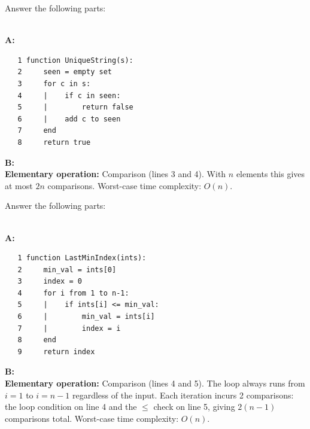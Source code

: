 \documentclass[10pt]{exam}
\begin{document}
\begin{questions}
\question[8] Answer the following parts:

\begin{solution}\\
    \textbf{A:}
    \begin{verbatim}
   1 function UniqueString(s):
   2     seen = empty set
   3     for c in s:
   4     |    if c in seen:
   5     |        return false
   6     |    add c to seen
   7     end
   8     return true
    \end{verbatim}
    \textbf{B:}\\
    \textbf{Elementary operation:} Comparison (lines 3 and 4).
    With $n$ elements this gives at most $2n$ comparisons.
    Worst-case time complexity: $O(n)$.
\end{solution}

\question[8] Answer the following parts:

\begin{solution}\\
    \textbf{A:}
    \begin{verbatim}
   1 function LastMinIndex(ints):
   2     min_val = ints[0]
   3     index = 0
   4     for i from 1 to n-1:
   5     |    if ints[i] <= min_val:
   6     |        min_val = ints[i]
   7     |        index = i
   8     end
   9     return index
    \end{verbatim}
    \textbf{B:}\\
    \textbf{Elementary operation:} Comparison (lines 4 and 5).
    The loop always runs from $i = 1$ to $i = n-1$ regardless of the input. Each iteration incurs 2 comparisons: the loop condition on line 4 and the $\leq$ check on line 5, giving $2(n-1)$ comparisons total.
    Worst-case time complexity: $O(n)$.
\end{solution}


\end{questions}
\end{document}
